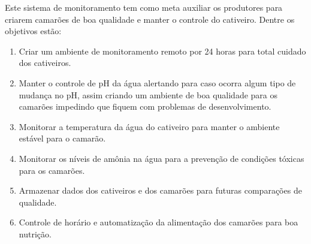 Este sistema de monitoramento tem como meta auxiliar os produtores para criarem camarões de boa qualidade e manter o controle do cativeiro. Dentre os objetivos estão: 	 

\begin{enumerate}

\item Criar um ambiente de monitoramento remoto por 24 horas para total cuidado dos cativeiros. 

\item Manter o controle de pH da água alertando para caso ocorra algum tipo de mudança no pH, assim criando um ambiente de boa qualidade para os camarões impedindo que fiquem com problemas de desenvolvimento. 

\item Monitorar a temperatura da água do cativeiro para manter o ambiente estável para o camarão. 

\item Monitorar os níveis de amônia na água para a prevenção de condições tóxicas para os camarões. 

\item Armazenar dados dos cativeiros e dos camarões para futuras comparações de qualidade. 

\item Controle de horário e automatização da alimentação dos camarões para boa nutrição.

\end{enumerate}